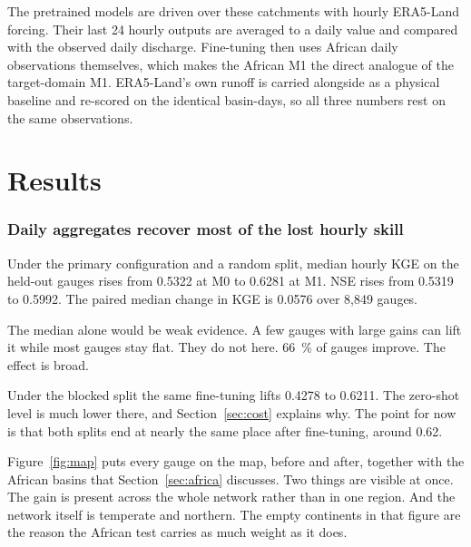 \documentclass[11pt,a4paper]{article}
\begin{document}
The pretrained models are driven over these catchments with hourly ERA5-Land forcing. Their last 24 hourly outputs are averaged to a daily value and compared with the observed daily discharge. Fine-tuning then uses African daily observations themselves, which makes the African M1 the direct analogue of the target-domain M1. ERA5-Land's own runoff is carried alongside as a physical baseline and re-scored on the identical basin-days, so all three numbers rest on the same observations.


\clearpage

\part{Results}

\section{Daily aggregates recover most of the lost hourly skill}\label{sec:main}
Under the primary configuration and a random split, median hourly KGE on the held-out gauges rises from \num{0.5322} at M0 to \num{0.6281} at M1. NSE rises from \num{0.5319} to \num{0.5992}. The paired median change in KGE is \num{+0.0576} over 8,849 gauges.

The median alone would be weak evidence. A few gauges with large gains can lift it while most gauges stay flat. They do not here. \SI{66}{\percent} of gauges improve. The effect is broad.

Under the blocked split the same fine-tuning lifts \num{0.4278} to \num{0.6211}. The zero-shot level is much lower there, and Section~\ref{sec:cost} explains why. The point for now is that both splits end at nearly the same place after fine-tuning, around \num{0.62}.

Figure~\ref{fig:map} puts every gauge on the map, before and after, together with the African basins that Section~\ref{sec:africa} discusses. Two things are visible at once. The gain is present across the whole network rather than in one region. And the network itself is temperate and northern. The empty continents in that figure are the reason the African test carries as much weight as it does.
\end{document}
